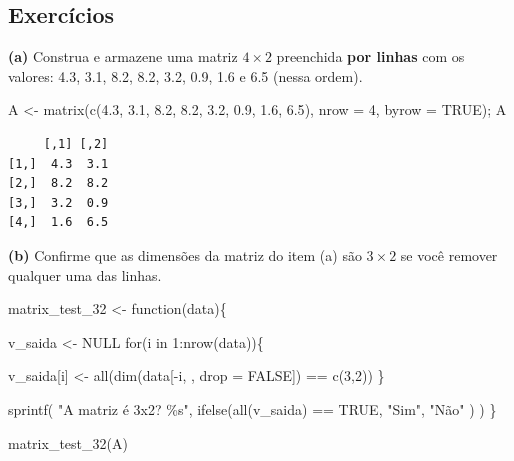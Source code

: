 \documentclass[
  letterpaper,
  DIV=11,
  numbers=noendperiod]{scrreprt}
\newenvironment{Shaded}{\begin{snugshade}}{\end{snugshade}}
\newcommand{\AttributeTok}[1]{\textcolor[rgb]{0.40,0.45,0.13}{#1}}
\newcommand{\ConstantTok}[1]{\textcolor[rgb]{0.56,0.35,0.01}{#1}}
\newcommand{\ControlFlowTok}[1]{\textcolor[rgb]{0.00,0.23,0.31}{#1}}
\newcommand{\DecValTok}[1]{\textcolor[rgb]{0.68,0.00,0.00}{#1}}
\newcommand{\FloatTok}[1]{\textcolor[rgb]{0.68,0.00,0.00}{#1}}
\newcommand{\FunctionTok}[1]{\textcolor[rgb]{0.28,0.35,0.67}{#1}}
\newcommand{\NormalTok}[1]{\textcolor[rgb]{0.00,0.23,0.31}{#1}}
\newcommand{\OtherTok}[1]{\textcolor[rgb]{0.00,0.23,0.31}{#1}}
\newcommand{\SpecialCharTok}[1]{\textcolor[rgb]{0.37,0.37,0.37}{#1}}
\newcommand{\StringTok}[1]{\textcolor[rgb]{0.13,0.47,0.30}{#1}}
\begin{document}
\subsection*{Exercícios}\label{exercuxedcios-1}

\textbf{(a)} Construa e armazene uma matriz \(4 \times 2\) preenchida
\textbf{por linhas} com os valores: 4.3, 3.1, 8.2, 8.2, 3.2, 0.9, 1.6 e
6.5 (nessa ordem).

\begin{Shaded}
\begin{Highlighting}[]
\NormalTok{A }\OtherTok{\textless{}{-}} \FunctionTok{matrix}\NormalTok{(}\FunctionTok{c}\NormalTok{(}\FloatTok{4.3}\NormalTok{, }\FloatTok{3.1}\NormalTok{, }\FloatTok{8.2}\NormalTok{, }\FloatTok{8.2}\NormalTok{, }\FloatTok{3.2}\NormalTok{, }\FloatTok{0.9}\NormalTok{, }\FloatTok{1.6}\NormalTok{, }\FloatTok{6.5}\NormalTok{), }\AttributeTok{nrow =} \DecValTok{4}\NormalTok{, }\AttributeTok{byrow =} \ConstantTok{TRUE}\NormalTok{); A}
\end{Highlighting}
\end{Shaded}

\begin{verbatim}
     [,1] [,2]
[1,]  4.3  3.1
[2,]  8.2  8.2
[3,]  3.2  0.9
[4,]  1.6  6.5
\end{verbatim}

\textbf{(b)} Confirme que as dimensões da matriz do item (a) são
\(3 \times 2\) se você remover qualquer uma das linhas.

\begin{Shaded}
\begin{Highlighting}[]
\NormalTok{matrix\_test\_32 }\OtherTok{\textless{}{-}} \ControlFlowTok{function}\NormalTok{(data)\{}

\NormalTok{v\_saida }\OtherTok{\textless{}{-}} \ConstantTok{NULL}
\ControlFlowTok{for}\NormalTok{(i }\ControlFlowTok{in} \DecValTok{1}\SpecialCharTok{:}\FunctionTok{nrow}\NormalTok{(data))\{}

\NormalTok{v\_saida[i] }\OtherTok{\textless{}{-}} \FunctionTok{all}\NormalTok{(}\FunctionTok{dim}\NormalTok{(data[}\SpecialCharTok{{-}}\NormalTok{i, , }\AttributeTok{drop =} \ConstantTok{FALSE}\NormalTok{]) }\SpecialCharTok{==} \FunctionTok{c}\NormalTok{(}\DecValTok{3}\NormalTok{,}\DecValTok{2}\NormalTok{))       }
\NormalTok{\}       }

\FunctionTok{sprintf}\NormalTok{( }\StringTok{"A matriz é 3x2? \%s"}\NormalTok{, }\FunctionTok{ifelse}\NormalTok{(}\FunctionTok{all}\NormalTok{(v\_saida) }\SpecialCharTok{==} \ConstantTok{TRUE}\NormalTok{, }\StringTok{"Sim"}\NormalTok{, }\StringTok{"Não"}\NormalTok{ ) )   }
\NormalTok{\} }


\FunctionTok{matrix\_test\_32}\NormalTok{(A)}
\end{Highlighting}
\end{Shaded}
\end{document}
